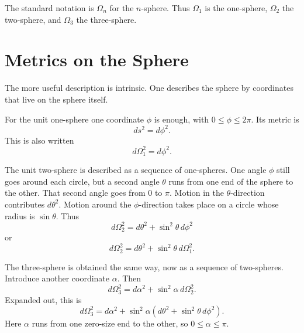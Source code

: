 The standard notation is \(\Omega_n\) for the \(n\)-sphere. Thus \(\Omega_1\) is the one-sphere, \(\Omega_2\) the two-sphere, and \(\Omega_3\) the three-sphere.

\section{Metrics on the Sphere}

The more useful description is intrinsic. One describes the sphere by coordinates that live on the sphere itself.

For the unit one-sphere one coordinate \(\phi\) is enough, with \(0\leq \phi \leq 2\pi\). Its metric is
\begin{equation}
ds^2=d\phi^2.
\end{equation}
This is also written
\begin{equation}
d\Omega_1^2=d\phi^2.
\end{equation}

The unit two-sphere is described as a sequence of one-spheres. One angle \(\phi\) still goes around each circle, but a second angle \(\theta\) runs from one end of the sphere to the other. That second angle goes from \(0\) to \(\pi\). Motion in the \(\theta\)-direction contributes \(d\theta^2\). Motion around the \(\phi\)-direction takes place on a circle whose radius is \(\sin\theta\). Thus
\begin{equation}
d\Omega_2^2=d\theta^2+\sin^2\theta\,d\phi^2
\end{equation}
or
\begin{equation}
d\Omega_2^2=d\theta^2+\sin^2\theta\,d\Omega_1^2.
\end{equation}

The three-sphere is obtained the same way, now as a sequence of two-spheres. Introduce another coordinate \(\alpha\). Then
\begin{equation}
d\Omega_3^2=d\alpha^2+\sin^2\alpha\,d\Omega_2^2.
\end{equation}
Expanded out, this is
\begin{equation}
d\Omega_3^2=d\alpha^2+\sin^2\alpha\left(d\theta^2+\sin^2\theta\,d\phi^2\right).
\end{equation}
Here \(\alpha\) runs from one zero-size end to the other, so \(0\leq \alpha \leq \pi\).

